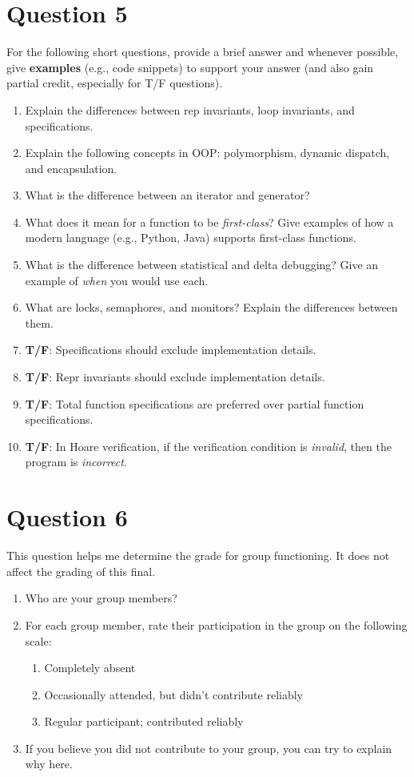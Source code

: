 \documentclass[10pt]{article}
\begin{document}
\newpage
\section{Question 5}

For the following short questions, provide a brief answer and whenever possible, give \textbf{examples} (e.g., code snippets) to support your answer (and also gain partial credit, especially for T/F questions).
\begin{enumerate} 
\item Explain the differences between rep invariants, loop invariants, and specifications.
\item Explain the following concepts in OOP: polymorphism, dynamic dispatch, and encapsulation.
\item  What is the difference between an iterator and generator?
\item What does it mean for a function to be \emph{first-class}? Give examples of how a modern language (e.g., Python, Java) supports first-class functions.
\item What is the difference between statistical and delta debugging?  Give an example of \emph{when} you would use each.
\item What are locks, semaphores, and monitors?  Explain the differences between them.
\item \textbf{T/F}: Specifications should exclude implementation details.
\item \textbf{T/F}: Repr invariants should exclude implementation details.
\item \textbf{T/F}: Total function specifications are preferred over partial function specifications.
\item \textbf{T/F}: In Hoare verification, if the verification condition is \emph{invalid}, then the program is \emph{incorrect}.
\end{enumerate}


\newpage
\section{Question 6}

This question helps me determine the grade for group functioning.  It does not affect the grading of this final.

\begin{enumerate}
\item Who are your group members?
\item For each group member, rate their participation in the group on the following scale:
  \begin{enumerate}
  \item Completely absent
  \item Occasionally attended, but didn't contribute reliably
  \item Regular participant; contributed reliably
  \end{enumerate}
\item If you believe you did not contribute to your group, you can try to explain why here.
\end{enumerate}
\end{document}
